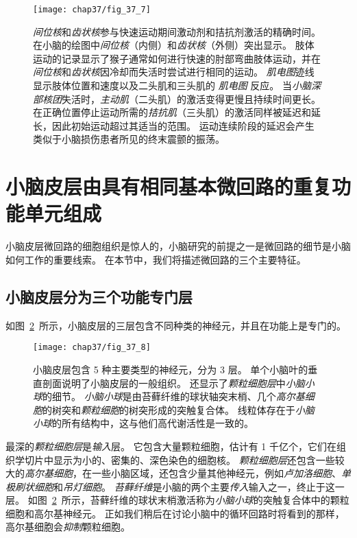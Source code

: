 \begin{figure}[htbp]
	\centering
	\texttt{[image: chap37/fig\_37\_7]}
	\caption{\textit{间位核}和\textit{齿状核}参与快速运动期间激动剂和拮抗剂激活的精确时间。
		在小脑的绘图中\textit{间位核}（内侧）和\textit{齿状核}（外侧）突出显示。
		肢体运动的记录显示了猴子通常如何进行快速的肘部弯曲肢体运动，并在\textit{间位核}和\textit{齿状核}因冷却而失活时尝试进行相同的运动。
		\textit{肌电图}迹线显示肢体位置和速度以及二头肌和三头肌的 \textit{肌电图} 反应。
		当\textit{小脑深部核团}失活时，\textit{主动肌}（二头肌）的激活变得更慢且持续时间更长。
		在正确位置停止运动所需的\textit{拮抗肌}（三头肌）的激活同样被延迟和延长，因此初始运动超过其适当的范围。
		运动连续阶段的延迟会产生类似于小脑损伤患者所见的终末震颤的振荡。}
	\label{fig:37_7}
\end{figure}




\section{小脑皮层由具有相同基本微回路的重复功能单元组成}

小脑皮层微回路的细胞组织是惊人的，小脑研究的前提之一是微回路的细节是小脑如何工作的重要线索。
在本节中，我们将描述微回路的三个主要特征。


\subsection{小脑皮层分为三个功能专门层}

如图~\ref{fig:37_8}~所示，小脑皮层的三层包含不同种类的神经元，并且在功能上是专门的。


\begin{figure}[htbp]
	\centering
	\texttt{[image: chap37/fig\_37\_8]}
	\caption{小脑皮层包含 5 种主要类型的神经元，分为 3 层。
		单个小脑叶的垂直剖面说明了小脑皮层的一般组织。
		还显示了\textit{颗粒细胞层}中\textit{小脑小球}的细节。
		\textit{小脑小球}是由苔藓纤维的球状轴突末梢、几个\textit{高尔基细胞}的树突和\textit{颗粒细胞}的树突形成的突触复合体。
		线粒体存在于\textit{小脑小球}的所有结构中，这与他们高代谢活性是一致的。}
	\label{fig:37_8}
\end{figure}


最深的\textit{颗粒细胞层}是\textit{输入}层。
它包含大量颗粒细胞，估计有 1 千亿个，它们在组织学切片中显示为小的、密集的、深色染色的细胞核。
\textit{颗粒细胞层}还包含一些较大的\textit{高尔基细胞}，在一些小脑区域，还包含少量其他神经元，例如\textit{卢加洛细胞}、\textit{单极刷状细胞}和\textit{吊灯细胞}。
\textit{苔藓纤维}是小脑的两个主要\textit{传入}输入之一，终止于这一层。
如图~\ref{fig:37_8}~所示，苔藓纤维的球状末梢激活称为\textit{小脑小球}的突触复合体中的颗粒细胞和高尔基神经元。
正如我们稍后在讨论小脑中的循环回路时将看到的那样，高尔基细胞会\textit{抑制}颗粒细胞。


